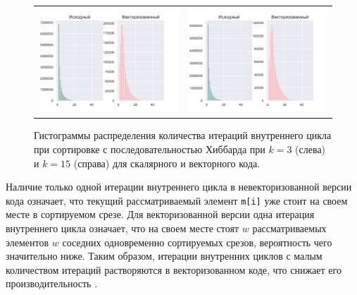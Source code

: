 \begin{figure}[h!]
\centering
\begin{tabular}{ll}
\includegraphics[scale=0.5]{./pics/text_4_vec_irreg/hibbard_k_3.pdf}
&
\includegraphics[scale=0.5]{./pics/text_4_vec_irreg/hibbard_k_15.pdf}
\end{tabular}
\singlespacing
{}\caption{Гистограммы распределения количества итераций внутреннего цикла при сортировке с последовательностью
Хиббарда при $k = 3$ (слева) и $k = 15$ (справа) для скалярного и векторного кода.}
\label{fig:text_4_vec_irreg_hibbard_hist}
\end{figure}

Наличие только одной итерации внутреннего цикла в невекторизованной версии кода означает, что текущий рассматриваемый элемент \texttt{m[i]} уже стоит на своем месте в сортируемом срезе.
Для векторизованной версии одна итерация внутреннего цикла означает, что на своем месте стоят $w$ рассматриваемых элементов $w$ соседних одновременно сортируемых срезов, вероятность чего значительно ниже.
Таким образом, итерации внутренних циклов с малым количеством итераций растворяются в векторизованном коде, что снижает его производительность \cite{Rybakov2018VecNest}.

